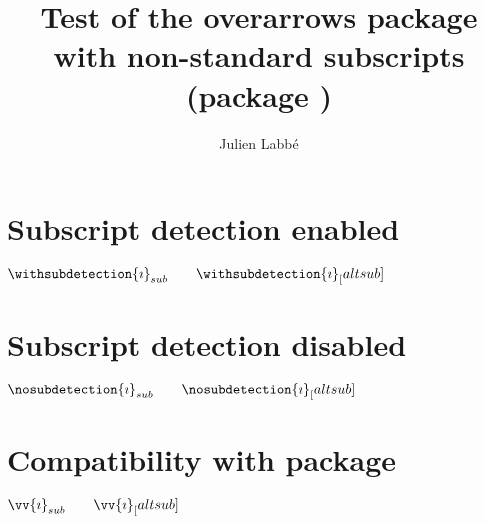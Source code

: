 \documentclass{article}
\title{Test of the \textsf{overarrows} package\\with non-standard subscripts (package \pkg{altsubsup})}
\author{Julien Labb\'e}
\begin{document}
\maketitle


\section{Subscript detection enabled}

\begin{dispExample}

$ \withsubdetection{\imath}_{sub} \qquad \withsubdetection{\imath}_[altsub]$
\end{dispExample}

\section{Subscript detection disabled}

\begin{dispExample}

$ \nosubdetection{\imath}_{sub} \qquad \nosubdetection{\imath}_[altsub]$
\end{dispExample}

\section{Compatibility with  package}

\begin{dispExample}
  $ \vv{\imath}_{sub} \qquad \vv{\imath}_[altsub]$
\end{dispExample}
\end{document}
